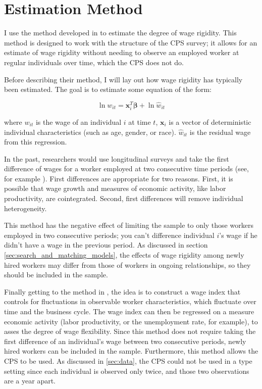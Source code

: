 \documentclass[11pt]{article}
\begin{document}

\section{Estimation Method}
\label{sec:statistical_method}

I use the method developed in \cite{haefke_sonntag_vanRens_2013} to estimate the degree of wage rigidity.
This method is designed to work with the structure of the CPS survey;
it allows for an estimate of wage rigidity without needing to observe an employed worker at regular individuals over time, which the CPS does not do.

Before describing their method, I will lay out how wage rigidity has typically been estimated.
The goal is to estimate some equation of the form:

\begin{equation}
    \label{eq:individual_wage}
    \ln w_{it} = \boldsymbol{x}_i^{T} \boldsymbol{\beta} + \ln \hat{w}_{it}
\end{equation}

where $w_{it}$ is the wage of an individual $i$ at time $t$, $\boldsymbol{x}_i$ is a vector of deterministic individual characteristics (such as age, gender, or race). $\hat{w}_{it}$ is the residual wage from this regression.

In the past, researchers would use longitudinal surveys and take the first difference of wages for a worker employed at two consecutive time periods (see, for example \cite{bils_1985}).
First differences are appropriate for two reasons.
First, it is possible that wage growth and measures of economic activity, like labor productivity, are cointegrated.
Second, first differences will remove individual heterogeneity.

This method has the negative effect of limiting the sample to only those workers employed in two consecutive periods;
you can't difference individual $i$'s wage if he didn't have a wage in the previous period.
As discussed in section \autoref{sec:search_and_matching_models}, the effects of wage rigidity among newly hired workers may differ from those of workers in ongoing relationships, so they should be included in the sample.

Finally getting to the method in \cite{haefke_sonntag_vanRens_2013}, the idea is to construct a wage index that controls for fluctuations in observable worker characteristics, which fluctuate over time and the business cycle.
The wage index can then be regressed on a measure economic activity (labor productivity, or the unemployment rate, for example), to asses the degree of wage flexibility.
Since this method does not require taking the first difference of an individual's wage between two consecutive periods, newly hired workers can be included in the sample.
Furthermore, this method allows the CPS to be used.
As discussed in \autoref{sec:data}, the CPS could not be used in a \cite{bils_1985} type setting since each individual is observed only twice, and those two observations are a year apart.
\end{document}
